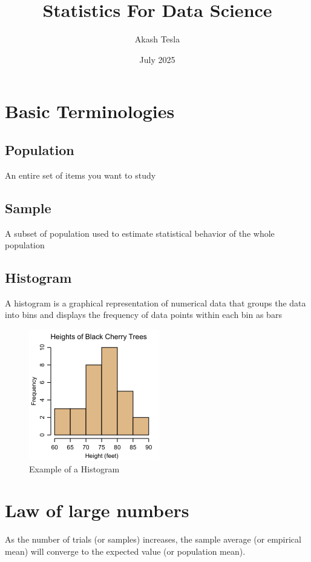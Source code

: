 \documentclass[12pt]{extarticle}
\title{Statistics For Data Science}
\author{Akash Tesla}
\date{July 2025}
\begin{document}
\tableofcontents
\newpage
\maketitle
\section{Basic Terminologies}

\subsection{Population}
An entire set of items you want to study 

\subsection{Sample} 
A subset of population used to estimate statistical behavior of the whole population 

\subsection{Histogram}
A histogram is a graphical representation of numerical data that groups the data into bins and displays the frequency of data points within each bin as bars

\begin{figure}[H]
    \centering
    \includegraphics[width=0.5\linewidth]{images/histogram_example.png}
    \caption{Example of a Histogram}
    \label{fig:1}
\end{figure}


\section{Law of large numbers}
As the number of trials (or samples) increases, the sample average (or empirical mean) will converge to the expected value (or population mean).
\end{document}
